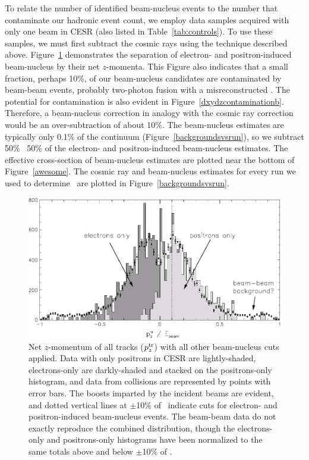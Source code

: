 \documentclass{cornell}
\begin{document}
To relate the number of identified beam-nucleus events to the number
that contaminate our hadronic event count, we employ data samples
acquired with only one beam in CESR (also listed in
Table~\ref{tab:controls}).  To use these samples, we must first
subtract the cosmic rays using the technique described above.
Figure~\ref{beamgaspz} demonstrates the separation of electron- and
positron-induced beam-nucleus by their net $z$-momenta.  This Figure
also indicates that a small fraction, perhaps 10\%, of our
beam-nucleus candidates are contaminated by beam-beam events, probably
two-photon fusion with a misreconstructed \dz.  The potential for
contamination is also evident in Figure~\ref{dxydzcontaminationb}.
Therefore, a beam-nucleus correction in analogy with the cosmic ray
correction would be an over-subtraction of about 10\%.  The
beam-nucleus estimates are typically only 0.1\% of the continuum
(Figure~\ref{backgroundsvsrun}), so we subtract 50\% \PM\ 50\% of the
electron- and positron-induced beam-nucleus estimates.  The effective
cross-section of beam-nucleus estimates are plotted near the bottom of
Figure~\ref{awesome}.  The cosmic ray and beam-nucleus estimates for
every run we used to determine \gee\ are plotted in
Figure~\ref{backgroundsvsrun}.

\begin{figure}[p]
  \begin{center}
    \includegraphics[width=\linewidth]{plots/beamgaspz}
  \end{center}
  \caption{\label{beamgaspz} Net $z$-momentum of all tracks
  ($p_z^{\mbox{\scriptsize tr}}$) with all other beam-nucleus cuts applied.  Data
  with only positrons in CESR are lightly-shaded, electrons-only are
  darkly-shaded and stacked on the positrons-only histogram, and data
  from collisions are represented by points with error bars.  The
  boosts imparted by the incident beams are evident, and dotted
  vertical lines at $\pm$10\% of \ebeam\ indicate cuts for electron-
  and positron-induced beam-nucleus events.  The beam-beam data do not
  exactly reproduce the combined distribution, though the
  electrons-only and positrons-only histograms have been normalized to
  the same totals above and below $\pm$10\% of \ebeam.}
\end{figure}
\end{document}
